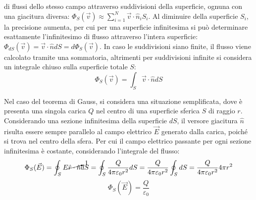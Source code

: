 \documentclass{article}
\numberwithin{equation}{subsection}
\begin{document}
di flussi dello stesso campo attraverso suddivisioni della superficie, ognuna con una giacitura diversa: 
$\Phi_S(\vec{v})\approx\sum_{i=1}^N\vec{v}\cdot\hat{n}_iS_i$. Al diminuire della superficie $S_i$, la precisione aumenta, per cui per una superficie infinitesima si può 
determinare esattamente l'infinitesimo di flusso attraverso l'intera superficie: $\Phi_{dS}(\vec{v})=\vec{v}\cdot\hat{n}dS=d\Phi_{S}(\vec{v})$. In caso le suddivisioni 
siano finite, il flusso viene calcolato tramite una sommatoria, altrimenti per suddivisioni infinite si considera un integrale chiuso sulla superficie totale $S$:
\begin{equation}
    \displaystyle\Phi_S(\vec{v})=\int_{S}\vec{v}\cdot\hat{n}dS
\end{equation}




Nel caso del teorema di Gauss, si considera una situazione semplificata, dove è presenta una singola carica $Q$ nel centro di una superficie sferica $S$ di raggio $r$. 
Considerando una sezione infinitesima della superficie $dS$, il versore giacitura $\hat{n}$ risulta essere sempre parallelo al campo elettrico $\vec{E}$ generato dalla carica, 
poiché si trova nel centro della sfera. Per cui il campo elettrico passante per ogni sezione infinitesima è costante, considerando l'integrale del flusso: 
\begin{gather*}
    \Phi_S(\vec{E})=\displaystyle\oint_{S}E\cancelto{1}{\hat{r}\cdot\hat{n}}dS=\oint_S\frac{Q}{4\pi\varepsilon_0r^2}dS=\frac{Q}{4\pi\varepsilon_0r^2}\oint_SdS=\frac{Q}{4\pi\varepsilon_0r^2}4\pi r^2
\end{gather*} 
\begin{equation}
    \Phi_S(\vec{E})=\frac{Q}{\varepsilon_0}
\end{equation}
\begin{center}
\end{center}
\end{document}
